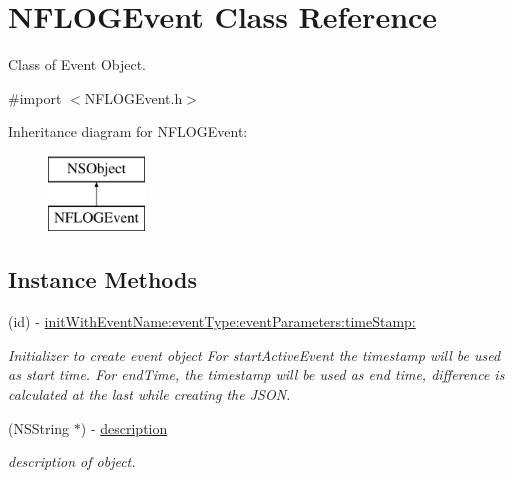\hypertarget{interface_n_f_l_o_g_event}{}\section{N\+F\+L\+O\+G\+Event Class Reference}
\label{interface_n_f_l_o_g_event}


Class of Event Object.  




{\ttfamily \#import $<$N\+F\+L\+O\+G\+Event.\+h$>$}

Inheritance diagram for N\+F\+L\+O\+G\+Event\+:\begin{figure}[H]
\begin{center}
\leavevmode
\includegraphics[height=2.000000cm]{interface_n_f_l_o_g_event}
\end{center}
\end{figure}
\subsection*{Instance Methods}
\begin{DoxyCompactItemize}
\item 
\mbox{\label{interface_n_f_l_o_g_event_ad1ab207aca486a4b31fe8e74c7559ac0}} 
(id) -\/ \hyperlink{interface_n_f_l_o_g_event_ad1ab207aca486a4b31fe8e74c7559ac0}{init\+With\+Event\+Name\+:event\+Type\+:event\+Parameters\+:time\+Stamp\+:}
\begin{DoxyCompactList}\small\item\em Initializer to create event object For start\+Active\+Event the timestamp will be used as start time. For end\+Time, the timestamp will be used as end time, difference is calculated at the last while creating the J\+S\+ON. \end{DoxyCompactList}\item 
\mbox{\label{interface_n_f_l_o_g_event_a466729f93dbef38aa5f2f81c07df29fe}} 
(N\+S\+String $\ast$) -\/ \hyperlink{interface_n_f_l_o_g_event_a466729f93dbef38aa5f2f81c07df29fe}{description}
\begin{DoxyCompactList}\small\item\em description of object. \end{DoxyCompactList}\end{DoxyCompactItemize}
